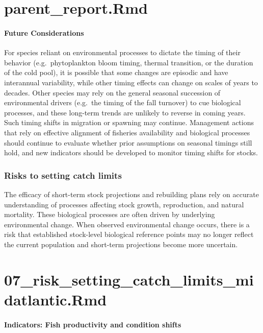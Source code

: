 \documentclass[
  10pt,
]{article}
\begin{document}
\section{parent\_report.Rmd}\label{parent_report.rmd-6}

\paragraph{Future Considerations}\label{future-considerations-1}

For species reliant on environmental processes to dictate the timing of their behavior (e.g.~phytoplankton bloom timing, thermal transition, or the duration of the cold pool), it is possible that some changes are episodic and have interannual variability, while other timing effects can change on scales of years to decades. Other species may rely on the general seasonal succession of environmental drivers (e.g.~the timing of the fall turnover) to cue biological processes, and these long-term trends are unlikely to reverse in coming years. Such timing shifts in migration or spawning may continue. Management actions that rely on effective alignment of fisheries availability and biological processes should continue to evaluate whether prior assumptions on seasonal timings still hold, and new indicators should be developed to monitor timing shifts for stocks.

\subsubsection{Risks to setting catch limits}\label{risks-to-setting-catch-limits}

The efficacy of short-term stock projections and rebuilding plans rely on accurate understanding of processes affecting stock growth, reproduction, and natural mortality. These biological processes are often driven by underlying environmental change. When observed environmental change occurs, there is a risk that established stock-level biological reference points may no longer reflect the current population and short-term projections become more uncertain.

\section{07\_risk\_setting\_catch\_limits\_midatlantic.Rmd}\label{risk_setting_catch_limits_midatlantic.rmd}

\paragraph{Indicators: Fish productivity and condition shifts}\label{indicators-fish-productivity-and-condition-shifts}
\end{document}
